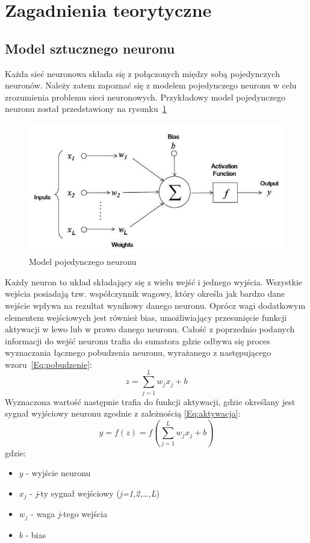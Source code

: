 \documentclass[12pt,twoside]{article}
\begin{document}
\clearpage

\section{Zagadnienia teorytyczne}
\subsection{Model sztucznego neuronu}
Każda sieć neuronowa składa się z połączonych między sobą pojedynczych neuronów. Należy zatem zapoznać się z modelem pojedynczego neuronu w celu zrozumienia problemu sieci neuronowych. Przykładowy model pojedynczego neuronu został przedstawiony na rysunku~\ref{Fig:neuron}
\begin{figure}[ht!]
	\centering
	\includegraphics[width=12cm]{figures/model_neuronu.png}
	\caption{Model pojedynczego neuronu}
	\label{Fig:neuron}
\end{figure}

Każdy neuron to układ składający się z wielu wejść i jednego wyjścia. Wszystkie wejścia posiadają tzw. współczynnik wagowy, który określa jak bardzo dane wejście wpływa na rezultat wynikowy danego neuronu. Oprócz wagi dodatkowym elementem wejściowych jest również bias, umożliwiający przesunięcie funkcji aktywacji w lewo lub w prawo danego neuronu.
Całość z poprzednio podanych informacji do wejść neuronu trafia do sumatora gdzie odbywa się proces wyznaczania łącznego pobudzenia
neuronu, wyrażanego z następującego wzoru~\ref{Eq:pobudzenie}:
\begin{equation}
	z = \sum_{j=1}^{L} w_{j}x_{j}+b
	\label{Eq:pobudzenie}
\end{equation}
Wyznaczona wartość następnie trafia do funkcji aktywacji, gdzie określany jest sygnał wyjściowy neuronu zgodnie z zależnością \ref{Eq:aktywacja}:
\newpage
\begin{equation}
	y = f(z) = f(\sum_{j=1}^{L} w_{j}x_{j}+b)
	\label{Eq:aktywacja}
\end{equation}
gdzie:
\begin{itemize}
	\item $y$ - wyjście neuronu
	\item $x_{j}$ - \textit{j}-ty sygnał wejściowy (\textit{j=1,2,\dots,L})
	\item $w_{j}$ - waga \textit{j}-tego wejścia
	\item $b$ - bias
\end{itemize}
\end{document}
